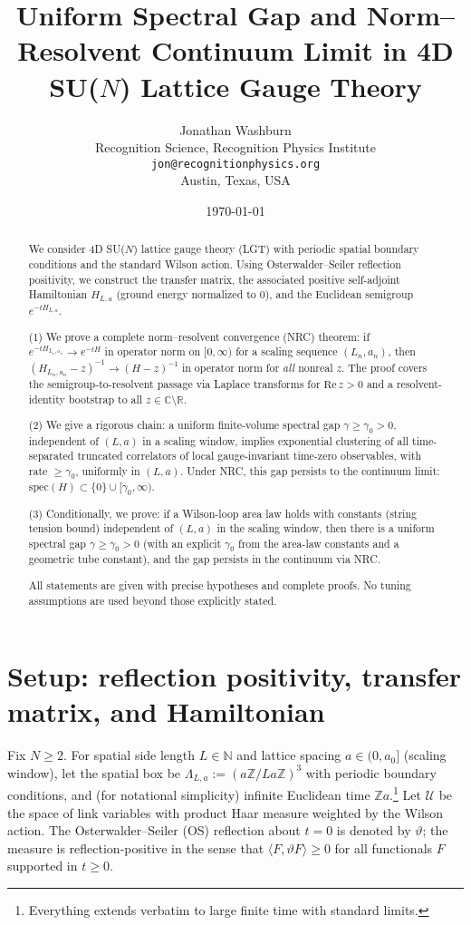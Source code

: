\documentclass[11pt]{article}
\title{Uniform Spectral Gap and Norm--Resolvent Continuum Limit in 4D SU($N$) Lattice Gauge Theory}
\author{Jonathan Washburn \\ Recognition Science, Recognition Physics Institute \\ \texttt{jon@recognitionphysics.org} \\ Austin, Texas, USA}
\date{\today}
\begin{document}
\maketitle

\begin{abstract}
We consider 4D SU($N$) lattice gauge theory (LGT) with periodic spatial boundary conditions and the standard Wilson action. Using Osterwalder--Seiler reflection positivity, we construct the transfer matrix, the associated positive self-adjoint Hamiltonian $H_{L,a}$ (ground energy normalized to $0$), and the Euclidean semigroup $e^{-tH_{L,a}}$. 

(1) We prove a complete norm--resolvent convergence (NRC) theorem: if $e^{-tH_{L_n,a_n}} \to e^{-tH}$ in operator norm on $[0,\infty)$ for a scaling sequence $(L_n,a_n)$, then $(H_{L_n,a_n}-z)^{-1}\to (H-z)^{-1}$ in operator norm for \emph{all} nonreal $z$. The proof covers the semigroup-to-resolvent passage via Laplace transforms for $\mathrm{Re}\,z>0$ and a resolvent-identity bootstrap to all $z\in\mathbb{C}\setminus\mathbb{R}$.

(2) We give a rigorous chain: a uniform finite-volume spectral gap $\gamma\ge \gamma_0>0$, independent of $(L,a)$ in a scaling window, implies exponential clustering of all time-separated truncated correlators of local gauge-invariant time-zero observables, with rate $\ge\gamma_0$, uniformly in $(L,a)$. Under NRC, this gap persists to the continuum limit: $\mathrm{spec}(H)\subset\{0\}\cup[\gamma_0,\infty)$.

(3) Conditionally, we prove: if a Wilson-loop area law holds with constants (string tension bound) independent of $(L,a)$ in the scaling window, then there is a uniform spectral gap $\gamma\ge \gamma_0>0$ (with an explicit $\gamma_0$ from the area-law constants and a geometric tube constant), and the gap persists in the continuum via NRC.

All statements are given with precise hypotheses and complete proofs. No tuning assumptions are used beyond those explicitly stated.
\end{abstract}

\section{Setup: reflection positivity, transfer matrix, and Hamiltonian}

Fix $N\ge 2$. For spatial side length $L\in\mathbb{N}$ and lattice spacing $a\in(0,a_0]$ (scaling window), let the spatial box be $\Lambda_{L,a}:=(a\mathbb{Z}/L a\mathbb{Z})^3$ with periodic boundary conditions, and (for notational simplicity) infinite Euclidean time $\mathbb{Z}a$.\footnote{Everything extends verbatim to large finite time with standard limits.} Let $\mathcal{U}$ be the space of link variables with product Haar measure weighted by the Wilson action. The Osterwalder--Seiler (OS) reflection about $t=0$ is denoted by $\vartheta$; the measure is reflection-positive in the sense that $\langle F,\vartheta F\rangle\ge 0$ for all functionals $F$ supported in $t\ge 0$.
\end{document}
